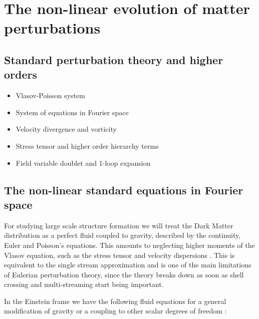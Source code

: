 \chapter{The non-linear evolution of matter perturbations \label{chap:nonlinear}} %






\section{Standard perturbation theory and higher orders}
\begin{itemize}
\item Vlasov-Poisson system
\item System of equations in Fourier space
\item Velocity divergence and vorticity
\item Stress tensor and higher order hierarchy terms
\item Field variable doublet and 1-loop expansion
\end{itemize}



\section{The non-linear standard equations in Fourier space}

For studying large scale structure formation we will treat the Dark
Matter distribution as a perfect fluid coupled to gravity, described
by the continuity, Euler and Poisson's equations. This amounts to
neglecting higher moments of the Vlasov equation, such as the stress
tensor and velocity dispersions \cite{bernardeau_large-scale_2001}.
This is equivalent to the single stream approximation and is one of
the main limitations of Eulerian perturbation theory, since the theory
breaks down as soon as shell crossing and multi-streaming start being
important.

In the Einstein frame we have the following fluid equations for a
general modification of gravity or a coupling to other scalar degrees
of freedom \cite{pietroni_flowing_2008}:

